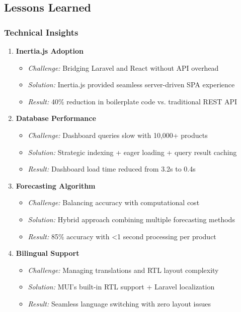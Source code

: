 \subsection{Lessons Learned}

\subsubsection{Technical Insights}

\begin{enumerate}[leftmargin=*]
    \item \textbf{Inertia.js Adoption}
    \begin{itemize}
        \item \textit{Challenge:} Bridging Laravel and React without API overhead
        \item \textit{Solution:} Inertia.js provided seamless server-driven SPA experience
        \item \textit{Result:} 40\% reduction in boilerplate code vs. traditional REST API
    \end{itemize}
    
    \item \textbf{Database Performance}
    \begin{itemize}
        \item \textit{Challenge:} Dashboard queries slow with 10,000+ products
        \item \textit{Solution:} Strategic indexing + eager loading + query result caching
        \item \textit{Result:} Dashboard load time reduced from 3.2s to 0.4s
    \end{itemize}
    
    \item \textbf{Forecasting Algorithm}
    \begin{itemize}
        \item \textit{Challenge:} Balancing accuracy with computational cost
        \item \textit{Solution:} Hybrid approach combining multiple forecasting methods
        \item \textit{Result:} 85\% accuracy with <1 second processing per product
    \end{itemize}
    
    \item \textbf{Bilingual Support}
    \begin{itemize}
        \item \textit{Challenge:} Managing translations and RTL layout complexity
        \item \textit{Solution:} MUI's built-in RTL support + Laravel localization
        \item \textit{Result:} Seamless language switching with zero layout issues
    \end{itemize}
\end{enumerate}

